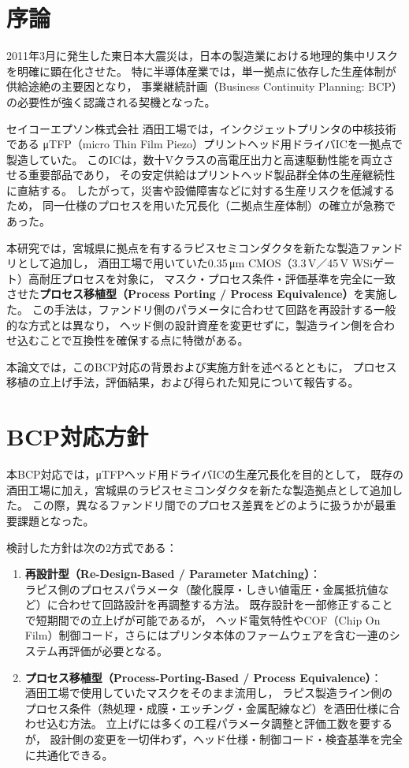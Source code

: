 \documentclass[conference]{IEEEtran}
\begin{document}
\section{序論}
2011年3月に発生した東日本大震災は，日本の製造業における地理的集中リスクを明確に顕在化させた。
特に半導体産業では，単一拠点に依存した生産体制が供給途絶の主要因となり，
事業継続計画（Business Continuity Planning: BCP）の必要性が強く認識される契機となった。

セイコーエプソン株式会社 酒田工場では，インクジェットプリンタの中核技術である
μTFP（micro Thin Film Piezo）プリントヘッド用ドライバICを一拠点で製造していた。
このICは，数十Vクラスの高電圧出力と高速駆動性能を両立させる重要部品であり，
その安定供給はプリントヘッド製品群全体の生産継続性に直結する。
したがって，災害や設備障害などに対する生産リスクを低減するため，
同一仕様のプロセスを用いた冗長化（二拠点生産体制）の確立が急務であった。

本研究では，宮城県に拠点を有するラピスセミコンダクタを新たな製造ファンドリとして追加し，
酒田工場で用いていた0.35\,μm CMOS（3.3\,V／45\,V WSiゲート）高耐圧プロセスを対象に，
マスク・プロセス条件・評価基準を完全に一致させた\textbf{プロセス移植型（Process Porting / Process Equivalence）}を実施した。
この手法は，ファンドリ側のパラメータに合わせて回路を再設計する一般的な方式とは異なり，
ヘッド側の設計資産を変更せずに，製造ライン側を合わせ込むことで互換性を確保する点に特徴がある。

本論文では，このBCP対応の背景および実施方針を述べるとともに，
プロセス移植の立上げ手法，評価結果，および得られた知見について報告する。

\section{BCP対応方針}
本BCP対応では，μTFPヘッド用ドライバICの生産冗長化を目的として，
既存の酒田工場に加え，宮城県のラピスセミコンダクタを新たな製造拠点として追加した。
この際，異なるファンドリ間でのプロセス差異をどのように扱うかが最重要課題となった。

検討した方針は次の2方式である：
\begin{enumerate}
\item \textbf{再設計型（Re-Design-Based / Parameter Matching）}：\\
ラピス側のプロセスパラメータ（酸化膜厚・しきい値電圧・金属抵抗値など）に合わせて回路設計を再調整する方法。
既存設計を一部修正することで短期間での立上げが可能であるが，
ヘッド電気特性やCOF（Chip On Film）制御コード，さらにはプリンタ本体のファームウェアを含む一連のシステム再評価が必要となる。

\item \textbf{プロセス移植型（Process-Porting-Based / Process Equivalence）}：\\
酒田工場で使用していたマスクをそのまま流用し，
ラピス製造ライン側のプロセス条件（熱処理・成膜・エッチング・金属配線など）を酒田仕様に合わせ込む方法。
立上げには多くの工程パラメータ調整と評価工数を要するが，
設計側の変更を一切伴わず，ヘッド仕様・制御コード・検査基準を完全に共通化できる。
\end{enumerate}
\end{document}
